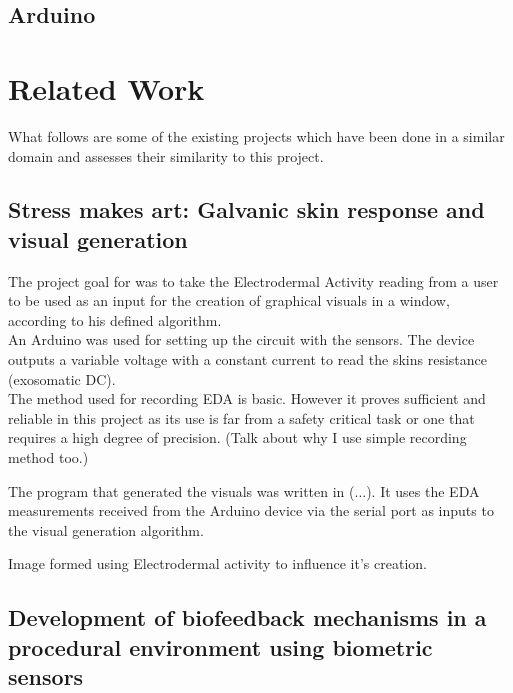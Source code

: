 \documentclass{report}
\begin{document}
\section{Arduino}


\chapter{Related Work}

What follows are some of the existing projects which have been done in a similar domain and assesses their similarity to this project.

\section{Stress makes art: Galvanic skin response and visual generation}

The project goal for \citep{jocelynzada2013stress} was to take the Electrodermal Activity reading
from a user to be used as an input for the creation of graphical visuals in a window, according to his defined algorithm.\\
An Arduino was used for setting up the circuit with the sensors. The device outputs a variable voltage with a constant current to read the skins resistance (exosomatic DC).\\
The method used for recording EDA is basic. However it proves sufficient and reliable in this project as its use is far from a safety critical task or one that requires a high degree of precision.
(Talk about why I use simple recording method too.)

The program that generated the visuals was written in (...). It uses the EDA measurements received from the Arduino device via the serial port as inputs to the visual generation algorithm.

\vspace{0.8cm}

\centerline{}
\centerline{Image formed using Electrodermal activity to influence it's creation.}

\vspace{0.8cm}

\section{Development of biofeedback mechanisms in a procedural environment using biometric sensors}
\end{document}
